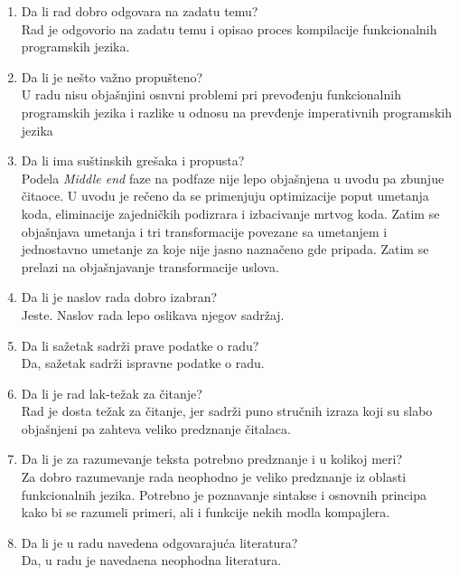 \documentclass[a4paper]{report}
\begin{document}
\begin{enumerate}

\item Da li rad dobro odgovara na zadatu temu?\\
Rad je odgovorio na zadatu temu i opisao proces kompilacije funkcionalnih programskih jezika.

\item Da li je nešto važno propušteno?\\
U radu nisu objašnjini osnvni problemi pri prevođenju funkcionalnih programskih jezika i razlike u odnosu na prevđenje imperativnih programskih jezika

\item Da li ima suštinskih grešaka i propusta?\\
Podela \emph{Middle end} faze na podfaze nije lepo objašnjena u uvodu pa zbunjue čitaoce. U uvodu je rečeno da se primenjuju  optimizacije poput umetanja koda, eliminacije zajedničkih podizrara i izbacivanje mrtvog koda. Zatim se objašnjava umetanja i tri transformacije povezane sa umetanjem i jednostavno umetanje za koje nije jasno naznačeno gde pripada. Zatim se prelazi na objašnjavanje transformacije uslova.

\item Da li je naslov rada dobro izabran?\\
Jeste. Naslov rada lepo oslikava njegov sadržaj.

\item Da li sažetak sadrži prave podatke o radu?\\
Da, sažetak sadrži ispravne podatke o radu.

\item Da li je rad lak-težak za čitanje?\\
Rad je dosta težak za čitanje, jer sadrži puno stručnih izraza koji su slabo objašnjeni pa zahteva veliko predznanje čitalaca. 

\item Da li je za razumevanje teksta potrebno 
predznanje i u kolikoj meri?\\
Za dobro razumevanje rada neophodno je veliko predznanje iz oblasti funkcionalnih jezika. Potrebno je poznavanje sintakse i osnovnih principa kako bi se razumeli primeri, ali i funkcije nekih modla kompajlera.

\item Da li je u radu navedena odgovarajuća literatura?\\
Da, u radu je navedaena neophodna literatura.


\end{enumerate}
\end{document}
